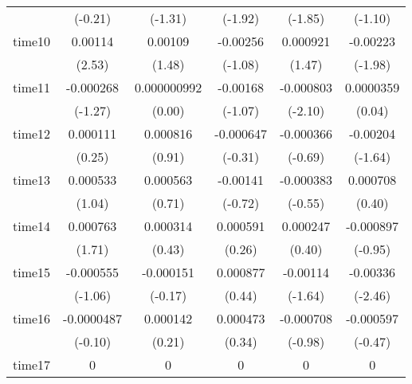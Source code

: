 \begin{table}[htbp]
\begin{tabular}{l*{5}{c}}
            &     (-0.21)         &     (-1.31)         &     (-1.92)         &     (-1.85)         &     (-1.10)         \\
time10      &     0.00114\sym{*}  &     0.00109         &    -0.00256         &    0.000921         &    -0.00223\sym{*}  \\
            &      (2.53)         &      (1.48)         &     (-1.08)         &      (1.47)         &     (-1.98)         \\
time11      &   -0.000268         & 0.000000992         &    -0.00168         &   -0.000803\sym{*}  &   0.0000359         \\
            &     (-1.27)         &      (0.00)         &     (-1.07)         &     (-2.10)         &      (0.04)         \\
time12      &    0.000111         &    0.000816         &   -0.000647         &   -0.000366         &    -0.00204         \\
            &      (0.25)         &      (0.91)         &     (-0.31)         &     (-0.69)         &     (-1.64)         \\
time13      &    0.000533         &    0.000563         &    -0.00141         &   -0.000383         &    0.000708         \\
            &      (1.04)         &      (0.71)         &     (-0.72)         &     (-0.55)         &      (0.40)         \\
time14      &    0.000763         &    0.000314         &    0.000591         &    0.000247         &   -0.000897         \\
            &      (1.71)         &      (0.43)         &      (0.26)         &      (0.40)         &     (-0.95)         \\
time15      &   -0.000555         &   -0.000151         &    0.000877         &    -0.00114         &    -0.00336\sym{*}  \\
            &     (-1.06)         &     (-0.17)         &      (0.44)         &     (-1.64)         &     (-2.46)         \\
time16      &  -0.0000487         &    0.000142         &    0.000473         &   -0.000708         &   -0.000597         \\
            &     (-0.10)         &      (0.21)         &      (0.34)         &     (-0.98)         &     (-0.47)         \\
time17      &           0         &           0         &           0         &           0         &           0         \\

\end{tabular}
\end{table}
